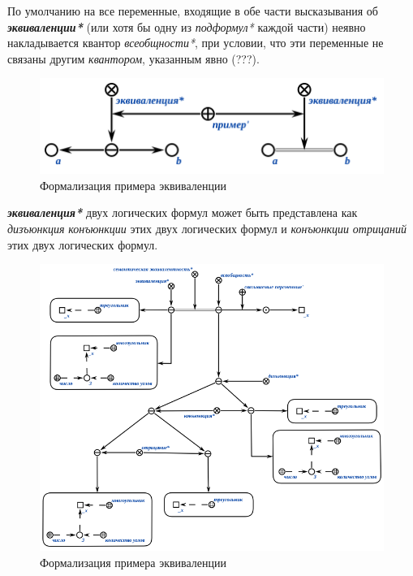 По умолчанию на все переменные, входящие в обе части высказывания об \textbf{\textit{эквиваленции*}} (или хотя бы одну из \textit{подформул*} каждой части) неявно накладывается квантор \textit{всеобщности*}, при условии, что эти переменные не связаны другим \textit{квантором}, указанным явно (???).

\begin{figure}[http]
	\includegraphics[scale=0.8]{author/part2/figures/logic/equivalent.png}
	\caption{Формализация примера эквиваленции}
	\label{fig:equivalent}
\end{figure}

\textbf{\textit{эквиваленция*}} двух логических формул может быть представлена как \textit{дизъюнкция} \textit{конъюнкции} этих двух логических формул и \textit{конъюнкции} \textit{отрицаний} этих двух логических формул.

\begin{figure}[http]
	\includegraphics[scale=0.8]{author/part2/figures/logic/equivalence_representation.png}
	\caption{Формализация примера эквиваленции}
	\label{fig:equivalence_representation}
\end{figure}

